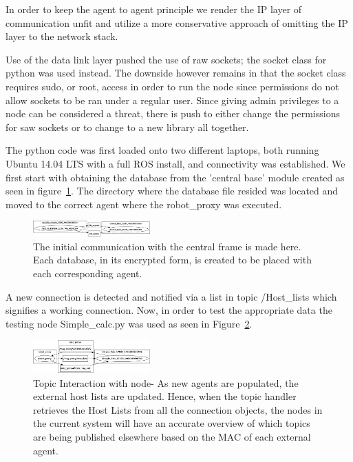 \documentclass[conference]{IEEEtran}
\begin{document}
In order to keep the agent to agent principle we render the IP layer of communication unfit and utilize a more conservative approach of omitting the IP layer to the network stack.

Use of the data link layer pushed the use of raw sockets; the socket class for python was used instead. The downside however remains in that the socket class requires sudo, or root, access in order to run the node since permissions do not allow sockets to be ran under a regular user. Since giving admin privileges to a node can be considered a threat, there is push to either change the permissions for saw sockets or to change to a new library all together.

The python code was first loaded onto two different laptops, both running Ubuntu 14.04 LTS with a full ROS install, and connectivity was established. We first start with obtaining the database from the 'central base' module created as seen in figure~\ref{fig:TopicIntr1}. The directory where the database file resided was located and moved to the correct agent where the robot\_proxy was executed.

\begin{figure}[]
\centering
\includegraphics[width=0.4\textwidth]{TopicIntr1}
\caption{The initial communication with the central frame is made here. Each database, in its encrypted form, is created to be placed with each corresponding agent.}
\label{fig:TopicIntr1}
\end{figure}

A new connection is detected and notified via a list in topic /Host\_lists which signifies a working connection. Now, in order to test the appropriate data the testing node Simple\_calc.py was used as seen in Figure~\ref{fig:TopicIntr2}.

\begin{figure}[]
\centering
\includegraphics[width=0.4\textwidth]{TopicIntr2}
\caption{Topic Interaction with node- As new agents are populated, the external host lists are updated. Hence, when the topic handler retrieves the Host Lists from all the connection objects, the nodes in the current system will have an accurate overview of which topics are being published elsewhere based on the MAC of each external agent.}
\label{fig:TopicIntr2}
\end{figure}
\end{document}
